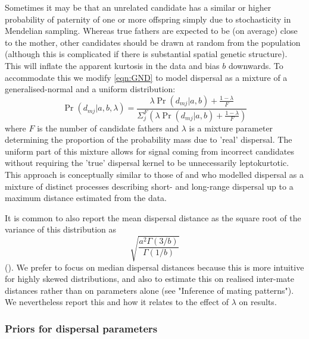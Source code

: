\documentclass[10pt, a4paper, twocolumn]{article} %
\begin{document}
Sometimes it may be that an unrelated candidate has a similar or higher probability of paternity of one or more offspring simply due to stochasticity in Mendelian sampling.
Whereas true fathers are expected to be (on average) close to the mother, other candidates should be drawn at random from the population (although this is complicated if there is substantial spatial genetic structure).
This will inflate the apparent kurtosis in the data and bias $b$ downwards.
To accommodate this we modify \ref{eqn:GND} to model dispersal as a mixture of a generalised-normal and a uniform distribution:
\begin{equation}\label{eqn:mixture_model}
\Pr(d_{mj} | a,b,\lambda) = \frac{
    \lambda \Pr(d_{mj} | a,b) + \frac{1-\lambda}{F}
    }{
    \Sigma_j^F( \lambda \Pr(d_{mj} | a,b) + \frac{1-\lambda}{F})
    }
\end{equation}
where $F$ is the number of candidate fathers and $\lambda$ is a mixture parameter determining the proportion of the probability mass due to ’real’ dispersal.
The uniform part of this mixture allows for signal coming from incorrect candidates without requiring the 'true' dispersal kernel to be unnecessarily leptokurtotic.
This approach is conceptually similar to those of \cite{streiff1999pollen} and \cite{slavov2009extensive} who modelled dispersal as a mixture of distinct processes describing short- and long-range dispersal up to a maximum distance estimated from the data.

It is common to also report the mean dispersal distance as the square root of the variance of this distribution as
\begin{equation}
\label{eqn:sd_GND}    
\sqrt{ \frac{ a^2 \Gamma(3/b) }{ \Gamma(1/b) } }
\end{equation}
(\cite{Nadarajah2005}).
We prefer to focus on median dispersal distances because this is more intuitive for highly skewed distributions, and also to estimate this on realised inter-mate distances rather than on parameters alone (see "Inference of mating patterns"). We nevertheless report this and how it relates to the effect of $\lambda$ on results.

\subsubsection{Priors for dispersal parameters}
\end{document}
